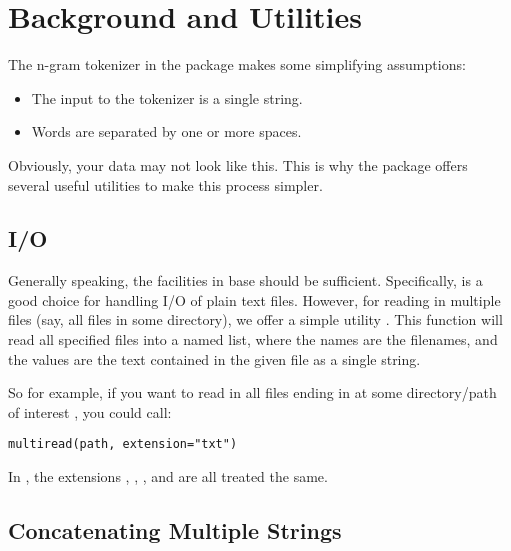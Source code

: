 \section{Background and Utilities}\label{utils}


The n-gram tokenizer in the  package makes some simplifying assumptions:
\begin{itemize}
  \item The input to the tokenizer is a single string.
  \item Words are separated by one or more spaces.
\end{itemize}
Obviously, your data may not look like this.  This is why the  package offers several useful utilities to make this process simpler.  


\subsection{I/O}

Generally speaking, the facilities in base  should be sufficient.  Specifically,  is a good choice for handling I/O of plain text files.  However, for reading in multiple files (say, all  files in some directory), we offer a simple utility .  This function will read all specified files into a named list, where the names are the filenames, and the values are the text contained in the given file as a single string.  

So for example, if you want to read in all files ending in  at some directory/path of interest , you could call:
\begin{lstlisting}[language=rr]
multiread(path, extension="txt")
\end{lstlisting}
In , the extensions , , , and  are all treated the same.



\subsection{Concatenating Multiple Strings}

